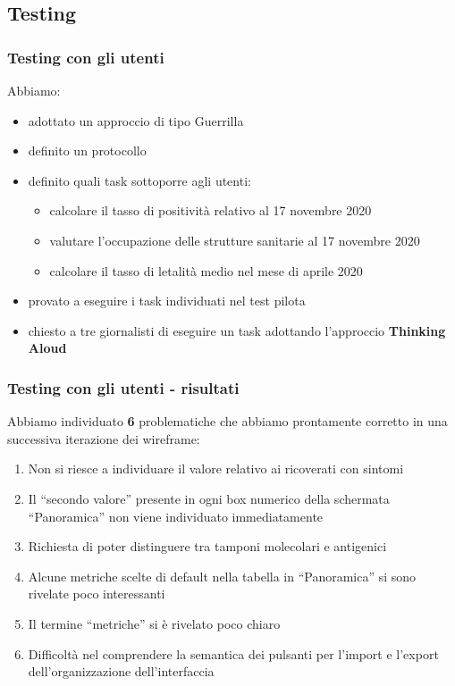 \documentclass[handout]{beamer}
\begin{document}
		\subsection{Testing}
		\begin{frame}
			\frametitle{Testing con gli utenti}
			Abbiamo:
			\begin{itemize}[<+->]
				\item adottato un approccio di tipo Guerrilla\\ 
				\item definito un protocollo\\
				\item definito quali task sottoporre agli utenti:
					\begin{itemize}[<+->]
						\item calcolare il tasso di positività relativo al 17 novembre 2020\\
						\item valutare l'occupazione delle strutture sanitarie al 17 novembre 2020\\
						\item calcolare il tasso di letalità medio nel mese di aprile 2020\\
					\end{itemize}
				\item provato a eseguire i task individuati nel test pilota\\
				\item chiesto a tre giornalisti di eseguire un task adottando l'approccio \textbf{Thinking Aloud}\\
			\end{itemize}
		\end{frame}

		\begin{frame}
			\frametitle{Testing con gli utenti - risultati}
			Abbiamo individuato \textbf{6} problematiche che abbiamo prontamente corretto in una successiva iterazione dei wireframe:
			\begin{enumerate}[<+->]
				\item Non si riesce a individuare il valore relativo ai ricoverati con sintomi\\
				\item Il ``secondo valore'' presente in ogni box numerico della schermata ``Panoramica'' non viene individuato immediatamente\\
				\item Richiesta di poter distinguere tra tamponi molecolari e antigenici\\
				\item Alcune metriche scelte di default nella tabella in ``Panoramica'' si sono rivelate poco interessanti\\
				\item Il termine ``metriche'' si è rivelato poco chiaro\\
				\item Difficoltà nel comprendere la semantica dei pulsanti per l'import e l'export dell'organizzazione dell'interfaccia\\
			\end{enumerate}
		\end{frame}
\end{document}
